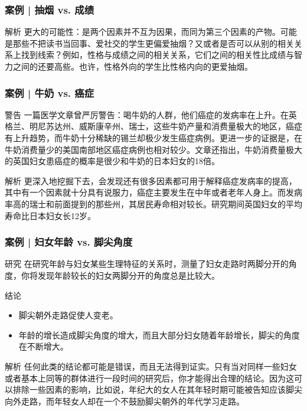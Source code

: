 \begin{frame}
  \frametitle{案例 | 抽烟 vs. 成绩}
  \begin{block}{解析}
    更大的可能性：是两个因素并不互为因果，而同为第三个因素的产物。可能是那些不把读书当回事、爱社交的学生更偏爱抽烟？又或者是否可以从别的相关关系上找到线索？例如，性格与成绩之间的相关关系，它们之间的相关性比成绩与智力之间的还要高些。也许，性格外向的学生比性格内向的更爱抽烟。
  \end{block}
\end{frame}

\begin{frame}
  \frametitle{案例 | 牛奶 vs. 癌症}
  \begin{block}{警告}
    一篇医学文章曾严厉警告：喝牛奶的人群，他们癌症的发病率在上升。在英格兰、明尼苏达州、威斯康辛州、瑞士，这些牛奶产量和消费量极大的地区，癌症有上升趋势，而牛奶十分稀缺的锡兰却极少发生癌症病例。更进一步的证据是，在牛奶消费量少的美国南部地区癌症病例也相对较少。文章还指出，牛奶消费量极大的英国妇女患癌症的概率是很少和牛奶的日本妇女的18倍。
  \end{block}
  \pause
  \begin{block}{解析}
更深入地挖掘下去，会发现还有很多因素都可用于解释癌症发病率的提高，其中有一个因素就十分具有说服力，癌症主要发生在中年或者老年人身上。而发病率高的瑞士和前面提到的那些州，其居民寿命相对较长。研究期间英国妇女的平均寿命比日本妇女长12岁。
  \end{block}
\end{frame}

\begin{frame}
  \frametitle{案例 | 妇女年龄 vs. 脚尖角度}
  \begin{block}{研究}
    在研究年龄与妇女某些生理特征的关系时，测量了妇女走路时两脚分开的角度，你将发现年龄较长的妇女两脚分开的角度总是比较大。
  \end{block}
  \pause
  \begin{block}{结论}
    \begin{itemize}
      \item 脚尖朝外走路促使人变老。
      \item 年龄的增长造成脚尖角度的增大，而且大部分妇女随着年龄增长，脚尖的角度在不断增大。
    \end{itemize}
  \end{block}
  \pause
  \begin{block}{解析}
任何此类的结论都可能是错误，而且无法得到证实。只有当对同样一些妇女或者基本上同等的群体进行一段时间的研究后，你才能得出合理的结论。因为这可以排除一些因素的影响，比如说，年纪大的女人在其年轻时期可能被告知应该脚尖向外走路，而年轻女人却在一个不鼓励脚尖朝外的年代学习走路。
  \end{block}
\end{frame}

